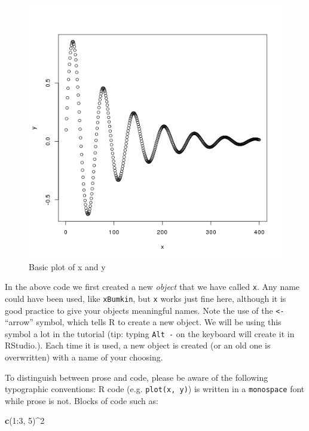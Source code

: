 \documentclass[]{article}
\newenvironment{Shaded}{}{}
\newcommand{\KeywordTok}[1]{\textcolor[rgb]{0.00,0.44,0.13}{\textbf{{#1}}}}
\newcommand{\DecValTok}[1]{\textcolor[rgb]{0.25,0.63,0.44}{{#1}}}
\newcommand{\NormalTok}[1]{{#1}}
\begin{document}
\begin{figure}[htbp]
\centering
\includegraphics{figure/Basic_plot_of_x_and_y.png}
\caption{Basic plot of x and y}
\end{figure}

In the above code we first created a new \emph{object} that we have
called \texttt{x}. Any name could have been used, like \texttt{xBumkin},
but \texttt{x} works just fine here, although it is good practice to
give your objects meaningful names. Note the use of the
\texttt{\textless{}-} ``arrow'' symbol, which tells R to create a new
object. We will be using this symbol a lot in the tutorial (tip: typing
\texttt{Alt -} on the keyboard will create it in RStudio.). Each time it
is used, a new object is created (or an old one is overwritten) with a
name of your choosing.

To distinguish between prose and code, please be aware of the following
typographic conventions: R code (e.g. \texttt{plot(x, y)}) is written in
a \texttt{monospace} font while prose is not. Blocks of code such as:

\begin{Shaded}
\begin{Highlighting}[]
\KeywordTok{c}\NormalTok{(}\DecValTok{1}\NormalTok{:}\DecValTok{3}\NormalTok{, }\DecValTok{5}\NormalTok{)^}\DecValTok{2}
\end{Highlighting}
\end{Shaded}
\end{document}
